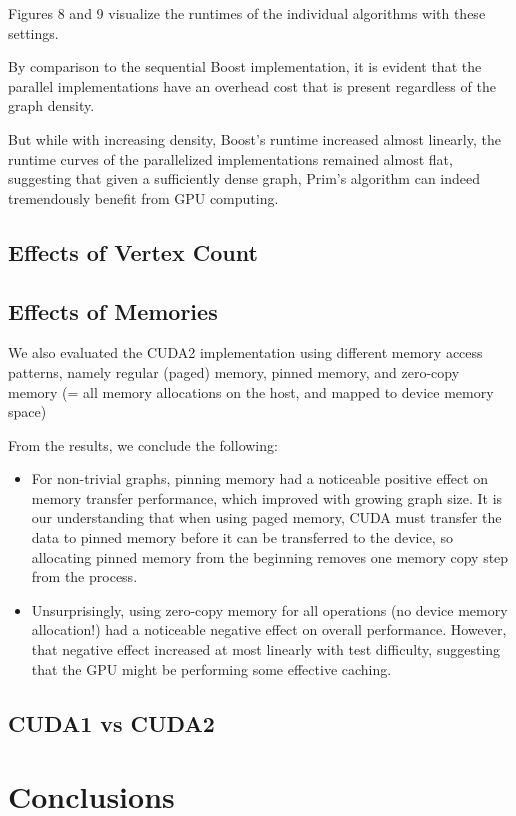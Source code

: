 \documentclass[sigconf,nonacm]{acmart}
\begin{document}
Figures 8 and 9 visualize the runtimes of the individual algorithms with these settings.

By comparison to the sequential Boost implementation, it is evident that the parallel implementations have an overhead cost that is present regardless of the graph density.

But while with increasing density, Boost’s runtime increased almost linearly, the runtime curves of the parallelized implementations remained almost flat, suggesting that given a sufficiently dense graph, Prim’s algorithm can indeed tremendously benefit from GPU computing.

\subsection{Effects of Vertex Count}

\subsection{Effects of Memories}

We also evaluated the CUDA2 implementation  using different memory access patterns, namely regular (paged) memory, pinned memory, and zero-copy memory (= all memory allocations on the host, and mapped to device memory space)

From the results, we conclude the following:
\begin{itemize}
\item For non-trivial graphs, pinning memory had a noticeable positive effect on memory transfer performance, which improved with growing graph size. It is our understanding that when using paged memory, CUDA must transfer the data to pinned memory before it can be transferred to the device, so allocating pinned memory from the beginning removes one memory copy step from the process.
\item Unsurprisingly, using zero-copy memory for all operations (no device memory allocation!) had a noticeable negative effect on overall performance. However, that negative effect increased at most linearly with test difficulty, suggesting that the GPU might be performing some effective caching.
\end{itemize}

\subsection{CUDA1 vs CUDA2}

\section{Conclusions}
\end{document}
